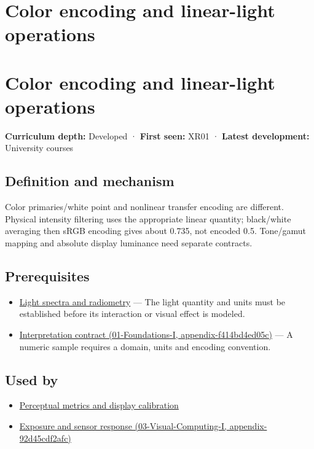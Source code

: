 \hypertarget{appendix-a9f83ad40792}{}
\section*{Color encoding and linear-light operations}
\section{Color encoding and linear-light operations}\label{color-encoding-and-linear-light-operations}

\textbf{Curriculum depth:} Developed · \textbf{First seen:} XR01 · \textbf{Latest development:} University courses

\subsection{Definition and mechanism}\label{definition-and-mechanism}

Color primaries/white point and nonlinear transfer encoding are different. Physical intensity filtering uses the appropriate linear quantity; black/white averaging then sRGB encoding gives about 0.735, not encoded 0.5. Tone/gamut mapping and absolute display luminance need separate contracts.

\subsection{Prerequisites}\label{prerequisites}

\begin{itemize}
\tightlist
\item
  \hyperref[appendix-215c2570199b]{Light spectra and radiometry} --- The light quantity and units must be established before its interaction or visual effect is modeled.
\item
  \href{}{Interpretation contract (01-Foundations-I, appendix-f414bd4ed05c)} --- A numeric sample requires a domain, units and encoding convention.
\end{itemize}

\subsection{Used by}\label{used-by}

\begin{itemize}
\tightlist
\item
  \hyperref[appendix-b2c1846508bf]{Perceptual metrics and display calibration}
\item
  \href{}{Exposure and sensor response (03-Visual-Computing-I, appendix-92d45cdf2afc)}
\end{itemize}

